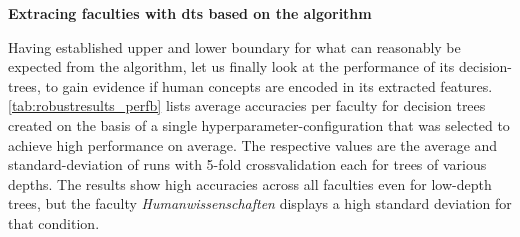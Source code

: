\begin{figure}[h]
	\begin{center}
	\end{center}
\end{figure}



\vspace{0.9ex}
\textbf{\large Extracing faculties with \glspl{dt} based on the 
algorithm}
\vspace{0.2ex}

Having established upper and lower boundary for what can reasonably be expected from the algorithm, let us finally look at the performance of its decision-trees, to gain evidence if human concepts are encoded in its extracted features. \autoref{tab:robustresults_perfb} lists average accuracies per faculty for decision trees created on the basis of a single hyperparameter-configuration that was selected to achieve high performance on average. The respective values are the average and standard-deviation of runs with 5-fold crossvalidation each for trees of various depths. The results show high accuracies across all faculties even for low-depth trees, but the faculty \textit{Humanwissenschaften} displays a high standard deviation for that condition.

